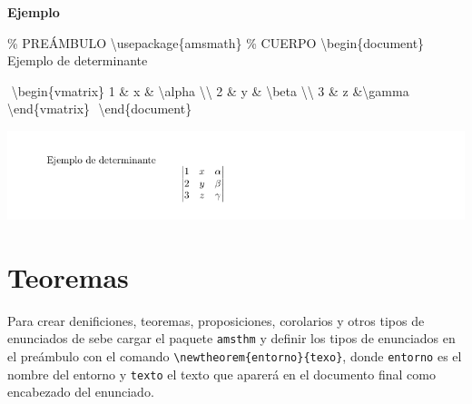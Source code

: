 \documentclass[
  letterpaper,
  DIV=11,
  numbers=noendperiod]{scrreport}
\newenvironment{Shaded}{\begin{snugshade}}{\end{snugshade}}
\newcommand{\BuiltInTok}[1]{\textcolor[rgb]{0.00,0.23,0.31}{#1}}
\newcommand{\CommentTok}[1]{\textcolor[rgb]{0.37,0.37,0.37}{#1}}
\newcommand{\ExtensionTok}[1]{\textcolor[rgb]{0.00,0.23,0.31}{#1}}
\newcommand{\KeywordTok}[1]{\textcolor[rgb]{0.00,0.23,0.31}{#1}}
\newcommand{\NormalTok}[1]{\textcolor[rgb]{0.00,0.23,0.31}{#1}}
\newcommand{\SpecialCharTok}[1]{\textcolor[rgb]{0.37,0.37,0.37}{#1}}
\newcommand{\SpecialStringTok}[1]{\textcolor[rgb]{0.13,0.47,0.30}{#1}}
\begin{document}
\textbf{Ejemplo}

\begin{Shaded}
\begin{Highlighting}[]
\CommentTok{\% PREÁMBULO}
\BuiltInTok{\textbackslash{}usepackage}\NormalTok{\{}\ExtensionTok{amsmath}\NormalTok{\}}
\CommentTok{\% CUERPO}
\KeywordTok{\textbackslash{}begin}\NormalTok{\{}\ExtensionTok{document}\NormalTok{\}}
\NormalTok{Ejemplo de determinante}

\SpecialStringTok{$$}
\KeywordTok{\textbackslash{}begin}\NormalTok{\{}\ExtensionTok{vmatrix}\NormalTok{\}}
\SpecialStringTok{1 \& x \& }\SpecialCharTok{\textbackslash{}alpha}\SpecialStringTok{ }\SpecialCharTok{\textbackslash{}\textbackslash{}}
\SpecialStringTok{2 \& y \& }\SpecialCharTok{\textbackslash{}beta}\SpecialStringTok{ }\SpecialCharTok{\textbackslash{}\textbackslash{}}
\SpecialStringTok{3 \& z \&}\SpecialCharTok{\textbackslash{}gamma}
\KeywordTok{\textbackslash{}end}\NormalTok{\{}\ExtensionTok{vmatrix}\NormalTok{\}}
\SpecialStringTok{$$}
\KeywordTok{\textbackslash{}end}\NormalTok{\{}\ExtensionTok{document}\NormalTok{\}}
\end{Highlighting}
\end{Shaded}

\begin{tcolorbox}[enhanced jigsaw, colback=white, colframe=quarto-callout-note-color-frame, title={Salida}, bottomtitle=1mm, colbacktitle=quarto-callout-note-color!10!white, bottomrule=.15mm, titlerule=0mm, opacityback=0, toptitle=1mm, arc=.35mm, left=2mm, rightrule=.15mm, toprule=.15mm, coltitle=black, leftrule=.75mm, opacitybacktitle=0.6, breakable]
\includegraphics{./img/formulas/determinante.png}
\end{tcolorbox}

\hypertarget{teoremas}{%
\section{Teoremas}\label{teoremas}}

Para crear denificiones, teoremas, proposiciones, corolarios y otros
tipos de enunciados de sebe cargar el paquete \texttt{amsthm} y definir
los tipos de enunciados en el preámbulo con el comando
\texttt{\textbackslash{}newtheorem\{entorno\}\{texo\}}, donde
\texttt{entorno} es el nombre del entorno y \texttt{texto} el texto que
aparerá en el documento final como encabezado del enunciado.
\end{document}
